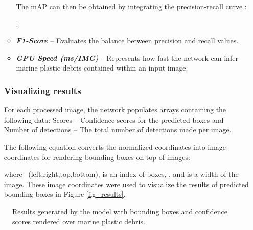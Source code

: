 \documentclass[a4paper,fleqn]{cas-dc}
\begin{document}
\begin{enumerate}[label={\alph*})]
\begin{itemize}
The mAP can then be obtained by integrating the precision-recall curve \cite{10.1007/978-3-642-40994-3_29}:

 \cite{10.1007/978-3-642-40994-3_29}:



\item \textit{\textbf{F1-Score}} -- Evaluates the balance between precision and recall values.

\item \textit{\textbf{GPU Speed (ms/IMG})} -- Represents how fast the network can infer marine plastic debris contained within an input image.

\end{itemize}


\subsubsection{Visualizing results}
For each processed image, the network populates arrays containing the following data: Scores -- Confidence scores for the predicted boxes and Number of detections -- The total number of detections made per image.

The following equation converts the normalized coordinates into image coordinates for rendering bounding boxes on top of images:


where ~(left,right,top,bottom),  is an index of boxes, , and  is a width of the image. These image coordinates were used to visualize the results of predicted bounding boxes in Figure \ref{fig_results}.
\iffalse
\begin{itemize}
\item \textit{}
\item \textit{}
\item \textit{}
\item \textit{}
\end{itemize}
\fi

\end{enumerate}

\begin{figure}[ht]
    \centering
{}
    \caption{Results generated by the model with bounding boxes and confidence scores rendered over marine plastic debris.}
\label{fig_initial_results}
\end{figure}
\end{document}
